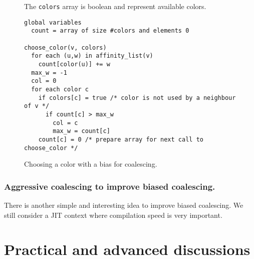 {\begin{figure}
  The {\tt colors} array is boolean and represent available colors.

  \begin{verbatim}
global variables
  count = array of size #colors and elements 0

choose_color(v, colors)
  for each (u,w) in affinity_list(v)
    count[color(u)] += w
  max_w = -1
  col = 0
  for each color c
    if colors[c] = true /* color is not used by a neighbour of v */
      if count[c] > max_w
        col = c
        max_w = count[c]
    count[c] = 0 /* prepare array for next call to choose_color */
  \end{verbatim}
  \caption{Choosing a color with a bias for coalescing.}
  \label{code:choose-color}
\end{figure}


\subsubsection{Aggressive coalescing to improve biased coalescing.}

There is another simple and interesting idea to improve biased coalescing. We 
still consider a JIT context where compilation speed is very important.






\section{Practical and advanced discussions}
\label{sec:practical-regalloc}


}
